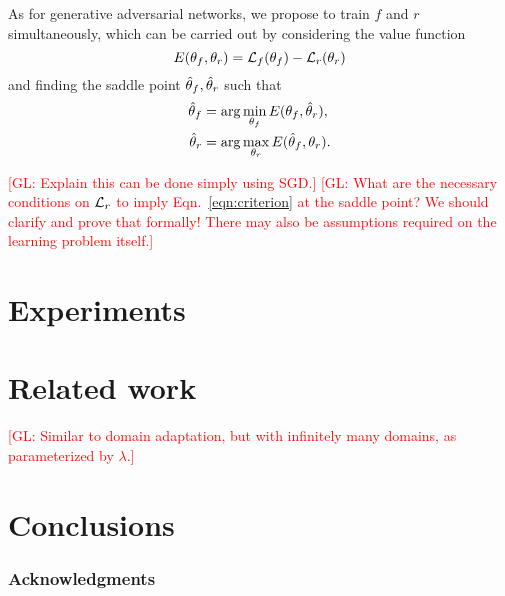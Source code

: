 \documentclass{article}
\newcommand{\glnote}[1]{\textcolor{red}{[GL: #1]}}
\theoremstyle{plain}
\begin{document}
As for generative adversarial networks, we propose to
train $f$ and $r$ simultaneously, which can be carried out by considering
the value function
\begin{equation}
    E(\theta_f, \theta_r) = {\cal L}_f(\theta_f) - {\cal L}_r(\theta_r)
\end{equation}
and finding the saddle point $\smash{\hat\theta_f}, \smash{\hat\theta_r}$ such that
\begin{align}
    \smash{\hat\theta_f} &= \arg \min_{\theta_f} E(\theta_f, \smash{\hat\theta_r}), \\
    \smash{\hat\theta_r} &= \arg \max_{\theta_r} E(\smash{\hat\theta_f}, \theta_r).
\end{align}

\glnote{Explain this can be done simply using SGD.}
\glnote{What are the necessary conditions on ${\cal L}_r$ to imply
Eqn.~\ref{eqn:criterion} at the saddle point? We should clarify and prove that
formally! There may also be assumptions required on the learning problem itself.}

\section{Experiments}

\section{Related work}

\glnote{Similar to domain adaptation, but with infinitely many domains,
as parameterized by $\lambda$.}

\section{Conclusions}

\subsubsection*{Acknowledgments}


{\small
}
\end{document}
